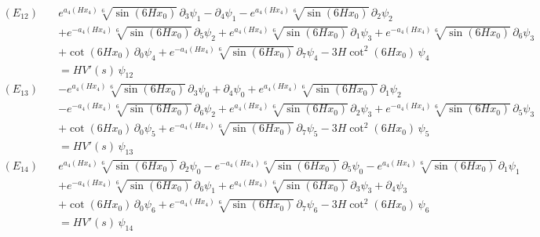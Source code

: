 \begin{align*}
(E_{12})\quad & e^{a_4\left(H x_4\right)} \sqrt[6]{\sin \left(6 H x_0\right)}\,\partial_{3}\psi_{1} - \partial_{4}\psi_{1} - e^{a_4\left(H x_4\right)} \sqrt[6]{\sin \left(6 H x_0\right)}\,\partial_{2}\psi_{2} \\
 &  + e^{-a_4\left(H x_4\right)} \sqrt[6]{\sin \left(6 H x_0\right)}\,\partial_{5}\psi_{2} + e^{a_4\left(H x_4\right)} \sqrt[6]{\sin \left(6 H x_0\right)}\,\partial_{1}\psi_{3} + e^{-a_4\left(H x_4\right)} \sqrt[6]{\sin \left(6 H x_0\right)}\,\partial_{6}\psi_{3} \\
 &  + \cot \left(6 H x_0\right)\,\partial_{0}\psi_{4} + e^{-a_4\left(H x_4\right)} \sqrt[6]{\sin \left(6 H x_0\right)}\,\partial_{7}\psi_{4} - 3 H \cot ^2\left(6 H x_0\right)\,\psi_{4} \\
 & = H V'(s)\,\psi_{12}
\end{align*}
\begin{align*}
(E_{13})\quad & -e^{a_4\left(H x_4\right)} \sqrt[6]{\sin \left(6 H x_0\right)}\,\partial_{3}\psi_{0} + \partial_{4}\psi_{0} + e^{a_4\left(H x_4\right)} \sqrt[6]{\sin \left(6 H x_0\right)}\,\partial_{1}\psi_{2} \\
 &  - e^{-a_4\left(H x_4\right)} \sqrt[6]{\sin \left(6 H x_0\right)}\,\partial_{6}\psi_{2} + e^{a_4\left(H x_4\right)} \sqrt[6]{\sin \left(6 H x_0\right)}\,\partial_{2}\psi_{3} + e^{-a_4\left(H x_4\right)} \sqrt[6]{\sin \left(6 H x_0\right)}\,\partial_{5}\psi_{3} \\
 &  + \cot \left(6 H x_0\right)\,\partial_{0}\psi_{5} + e^{-a_4\left(H x_4\right)} \sqrt[6]{\sin \left(6 H x_0\right)}\,\partial_{7}\psi_{5} - 3 H \cot ^2\left(6 H x_0\right)\,\psi_{5} \\
 & = H V'(s)\,\psi_{13}
\end{align*}
\begin{align*}
(E_{14})\quad & e^{a_4\left(H x_4\right)} \sqrt[6]{\sin \left(6 H x_0\right)}\,\partial_{2}\psi_{0} - e^{-a_4\left(H x_4\right)} \sqrt[6]{\sin \left(6 H x_0\right)}\,\partial_{5}\psi_{0} - e^{a_4\left(H x_4\right)} \sqrt[6]{\sin \left(6 H x_0\right)}\,\partial_{1}\psi_{1} \\
 &  + e^{-a_4\left(H x_4\right)} \sqrt[6]{\sin \left(6 H x_0\right)}\,\partial_{6}\psi_{1} + e^{a_4\left(H x_4\right)} \sqrt[6]{\sin \left(6 H x_0\right)}\,\partial_{3}\psi_{3} + \partial_{4}\psi_{3} \\
 &  + \cot \left(6 H x_0\right)\,\partial_{0}\psi_{6} + e^{-a_4\left(H x_4\right)} \sqrt[6]{\sin \left(6 H x_0\right)}\,\partial_{7}\psi_{6} - 3 H \cot ^2\left(6 H x_0\right)\,\psi_{6} \\
 & = H V'(s)\,\psi_{14}
\end{align*}

